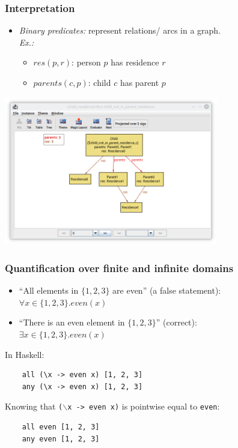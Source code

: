 \documentclass{beamer}
\begin{document}
\begin{frame}[fragile]\frametitle{Interpretation}
  \begin{itemize}
  \item \emph{Binary predicates:} represent relations/ arcs in a graph.\\
    \emph{Ex.:}
    \begin{itemize}
    \item $res(p,r)$: person $p$ has residence $r$
    \item $parents(c, p)$: child $c$ has parent $p$
    \end{itemize}
  \end{itemize}

\begin{center}
\includegraphics[width=0.7\textwidth]{child_residence_alloy_model.png}
\end{center}
  
\end{frame}

\begin{frame}[fragile]\frametitle{Quantification over finite and infinite domains}


  \begin{itemize}
  \item ``All elements in $\{1, 2, 3\}$ are even'' (a false statement):\\
    $\forall x \in \{1, 2, 3\}. even(x)$
  \item ``There is an even element in $\{1, 2, 3\}$'' (correct):\\
    $\exists x \in \{1, 2, 3\}. even(x)$
  \end{itemize}

  In Haskell:
  \begin{lstlisting}
    all (\x -> even x) [1, 2, 3]
    any (\x -> even x) [1, 2, 3]
  \end{lstlisting}

  Knowing that \texttt{($\backslash$x -> even x)} is pointwise equal to \texttt{even}:
  \begin{lstlisting}
    all even [1, 2, 3]
    any even [1, 2, 3]
  \end{lstlisting}

\end{frame}
\end{document}

